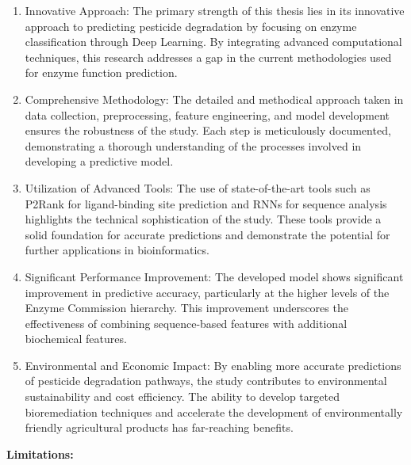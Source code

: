 \begin{enumerate}
    \item Innovative Approach: The primary strength of this thesis lies in its innovative approach to predicting pesticide degradation by focusing on enzyme classification through Deep Learning. By integrating advanced computational techniques, this research addresses a gap in the current methodologies used for enzyme function prediction.
    \item Comprehensive Methodology: The detailed and methodical approach taken in data collection, preprocessing, feature engineering, and model development ensures the robustness of the study. Each step is meticulously documented, demonstrating a thorough understanding of the processes involved in developing a predictive model.
    \item Utilization of Advanced Tools: The use of state-of-the-art tools such as P2Rank for ligand-binding site prediction and RNNs for sequence analysis highlights the technical sophistication of the study. These tools provide a solid foundation for accurate predictions and demonstrate the potential for further applications in bioinformatics.
    \item Significant Performance Improvement: The developed model shows significant improvement in predictive accuracy, particularly at the higher levels of the Enzyme Commission hierarchy. This improvement underscores the effectiveness of combining sequence-based features with additional biochemical features.
    \item Environmental and Economic Impact: By enabling more accurate predictions of pesticide degradation pathways, the study contributes to environmental sustainability and cost efficiency. The ability to develop targeted bioremediation techniques and accelerate the development of environmentally friendly agricultural products has far-reaching benefits.
\end{enumerate}

\textbf{Limitations:}

